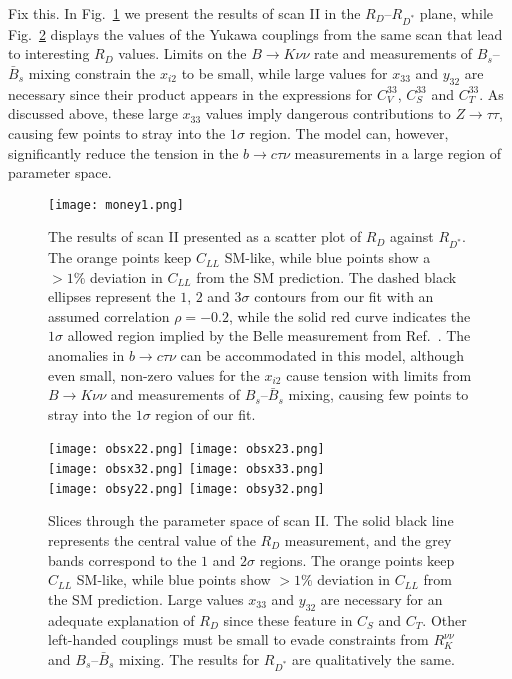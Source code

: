 {\color{red}Fix this.} In Fig.~\ref{fig:ch3-money1} we present the results of
scan II in the $R_D$--$R_{D^*}$ plane, while Fig.~\ref{fig:ch3-ObsScans}
displays the values of the Yukawa couplings from the same scan that lead to
interesting $R_D$ values. Limits on the $B \to K \nu \nu$ rate and measurements
of $B_s$--$\bar{B}_s$ mixing constrain the $x_{i2}$ to be small, while large
values for $x_{33}$ and $y_{32}$ are necessary since their product appears in
the expressions for $C_{ V }^{33}$, $C_{ S }^{33}$ and $C_{ T }^{33}$. As
discussed above, these large $x_{33}$ values imply dangerous contributions to
$Z \to \tau \tau$, causing few points to stray into the $1\sigma$ region. The
model can, however, significantly reduce the tension in the $b\to c \tau \nu$
measurements in a large region of parameter space.

\begin{figure}[t]
  \centering \texttt{[image: money1.png]}
  \caption[The results of scan II presented as a scatter plot of $R_D$ against
  $R_{D^*}$.]{The results of scan II presented as a scatter plot of $R_D$
    against $R_{D^*}$. The orange points keep $C_{LL}$ SM-like, while blue
    points show a $> 1\%$ deviation in $C_{LL}$ from the SM prediction. The
    dashed black ellipses represent the $1$, $2$ and $3\sigma$ contours from our
    fit with an assumed correlation $\rho = -0.2$, while the solid red curve
    indicates the $1\sigma$ allowed region implied by the Belle measurement from
    Ref.~\cite{Huschle:2015rga}. The anomalies in $b \to c \tau \nu$ can be
    accommodated in this model, although even small, non-zero values for the
    $x_{i2}$ cause tension with limits from $B \to K \nu \nu$ and measurements
    of $B_s$--$\bar{B}_s$ mixing, causing few points to stray into the $1\sigma$
    region of our fit.}
  \label{fig:ch3-money1}
\end{figure}

\begin{figure}
    \texttt{[image: obsx22.png]} \hfill
    \texttt{[image: obsx23.png]} \\
    \texttt{[image: obsx32.png]} \hfill
    \texttt{[image: obsx33.png]} \\
    \texttt{[image: obsy22.png]} \hfill
    \texttt{[image: obsy32.png]}
    \caption[Slices through the parameter space of scan II.]{Slices through the
      parameter space of scan II. The solid black line represents the central
      value of the $R_D$ measurement, and the grey bands correspond to the $1$
      and $2\sigma$ regions. The orange points keep $C_{LL}$ SM-like, while blue
      points show $> 1\%$ deviation in $C_{LL}$ from the SM prediction. Large
      values $x_{33}$ and $y_{32}$ are necessary for an adequate explanation of
      $R_D$ since these feature in $C_S$ and $C_T$. Other left-handed couplings
      must be small to evade constraints from $R_K^{\nu\nu}$ and
      $B_s$--$\bar{B}_s$ mixing. The results for $R_{D^*}$ are qualitatively the
      same.}
  \label{fig:ch3-ObsScans}
\end{figure}

